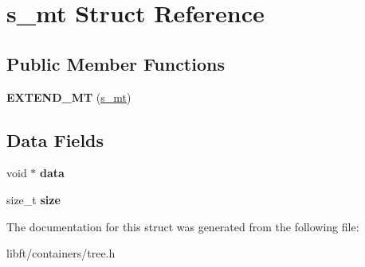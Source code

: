 \hypertarget{structs__mt}{}\section{s\+\_\+mt Struct Reference}
\label{structs__mt}
\subsection*{Public Member Functions}
\begin{DoxyCompactItemize}
\item 
\hypertarget{structs__mt_aa5acca3bbd0a5112af4238caaa513df1}{}{\bfseries E\+X\+T\+E\+N\+D\+\_\+\+M\+T} (\hyperlink{structs__mt}{s\+\_\+mt})\label{structs__mt_aa5acca3bbd0a5112af4238caaa513df1}

\end{DoxyCompactItemize}
\subsection*{Data Fields}
\begin{DoxyCompactItemize}
\item 
\hypertarget{structs__mt_a735984d41155bc1032e09bece8f8d66d}{}void $\ast$ {\bfseries data}\label{structs__mt_a735984d41155bc1032e09bece8f8d66d}

\item 
\hypertarget{structs__mt_a854352f53b148adc24983a58a1866d66}{}size\+\_\+t {\bfseries size}\label{structs__mt_a854352f53b148adc24983a58a1866d66}

\end{DoxyCompactItemize}


The documentation for this struct was generated from the following file\+:\begin{DoxyCompactItemize}
\item 
libft/containers/tree.\+h\end{DoxyCompactItemize}
